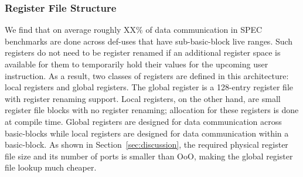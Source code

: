 \subsubsection{Register File Structure}
\label{sec:reg_files}

We find that on average roughly XX\% of data communication in SPEC benchmarks
are done across def-uses that have sub-basic-block live ranges. Such registers
do not need to be register renamed if an additional register space is available
for them to temporarily hold their values for the upcoming user instruction.  As
a result, two classes of registers are defined in this architecture: local registers
and global registers. The global register is a 128-entry register file with register
renaming support. Local registers, on the other hand, are small register
file blocks with no register renaming; allocation for these registers is
done at compile time.  Global registers are designed for data communication
across basic-blocks while local registers are designed for data communication
within a basic-block. As shown in Section~\ref{sec:discussion}, the
required physical register file size and its number of ports is smaller than
OoO, making the global register file lookup much cheaper. 

